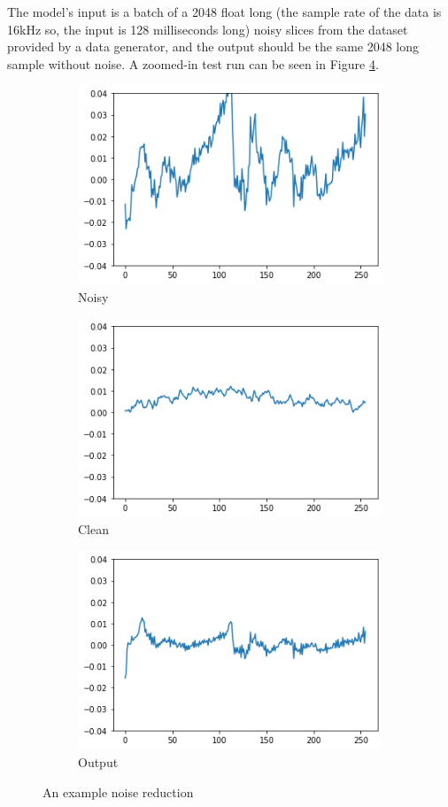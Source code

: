 \documentclass{article}
\begin{document}
	The model's input is a batch of a 2048 float long (the sample rate of the data is 16kHz so, the input is 128 milliseconds long) noisy slices from the dataset provided by a data generator, and the output should be the same 2048 long sample without noise. A zoomed-in test run can be seen in Figure \ref{fig:test}.
	
	\begin{figure}[!h]
		\centering
		\begin{subfigure}{.5\textwidth}
			\centering
			\includegraphics[width=.8\linewidth]{test_noisy}
			\caption{Noisy}
			\label{fig:test_noisy}
		\end{subfigure}%
		\begin{subfigure}{.5\textwidth}
			\centering
			\includegraphics[width=.8\linewidth]{test_clean_orig}
			\caption{Clean}
			\label{fig:test_clean_orig}
		\end{subfigure}
		\begin{subfigure}{1\textwidth}
			\centering
			\includegraphics[width=.4\linewidth]{test_clean}
			\caption{Output}
			\label{fig:test_clean}
		\end{subfigure}
		\caption{An example noise reduction}
		\label{fig:test}
	\end{figure}
\end{document}
